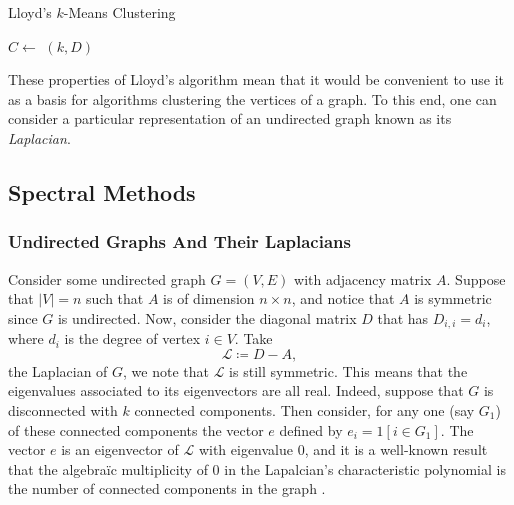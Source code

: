 \begin{algorithm}
	\caption{Lloyd's $k$-Means Clustering}
	\label{algorithm:lloyd}

	\BlankLine
		$C \longleftarrow$ \RandChoice$(k, D)$\;

	
\end{algorithm}

These properties of Lloyd's algorithm mean that it would be convenient to use it as a basis for
algorithms clustering the vertices of a graph. To this end, one can consider a particular 
representation of an undirected graph known as its \emph{Laplacian}. 

\subsection{Spectral Methods}

\subsubsection{Undirected Graphs And Their Laplacians}
Consider some undirected graph $G = (V, E)$ with adjacency matrix $A$. Suppose that $|V| = n$
such that $A$ is of dimension $n \times n$, and notice that $A$ is symmetric since $G$ is 
undirected. Now, consider the diagonal matrix $D$ that has $D_{i,i} = d_i$, where $d_i$ is the 
degree of vertex $i \in V$. Take 
$$
	\mathcal{L} \coloneqq D - A,
$$
the Laplacian of $G$, we note that $\mathcal{L}$ is still symmetric. This means that the 
eigenvalues associated to its eigenvectors are all real. Indeed, suppose that $G$ is disconnected
with $k$ connected components. Then consider, for any one (say $G_1$) of these connected components
the vector $e$ defined by $e_i = 1[i \in G_1]$. The vector $e$ is an eigenvector of $\mathcal{L}$ 
with eigenvalue 0, and it is a well-known result that the algebra\"ic multiplicity of 0 in the Lapalcian's characteristic polynomial is the number of connected components in the graph \cite{Chung:1997}.

